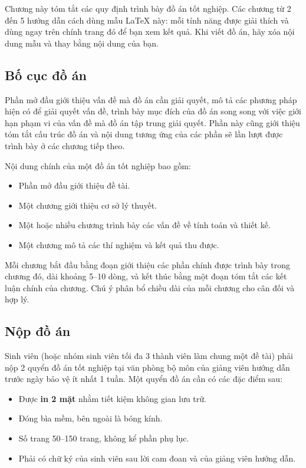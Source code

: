 Chương này tóm tắt các quy định trình bày đồ án tốt nghiệp. Các chương từ 2 đến 5 hướng dẫn cách dùng mẫu LaTeX này: mỗi tính năng được giải thích và dùng ngay trên chính trang đó để bạn xem kết quả. Khi viết đồ án, hãy xóa nội dung mẫu và thay bằng nội dung của bạn.

\subsection{Bố cục đồ án}
Phần mở đầu giới thiệu vấn đề mà đồ án cần giải quyết, mô tả các phương pháp hiện có để giải quyết vấn đề, trình bày mục đích của đồ án song song với việc giới hạn phạm vi của vấn đề mà đồ án tập trung giải quyết. Phần này cũng giới thiệu tóm tắt cấu trúc đồ án và nội dung tương ứng của các phần sẽ lần lượt được trình bày ở các chương tiếp theo.

Nội dung chính của một đồ án tốt nghiệp bao gồm:
\begin{itemize}
    \item Phần mở đầu giới thiệu đề tài.
    \item Một chương giới thiệu cơ sở lý thuyết.
    \item Một hoặc nhiều chương trình bày các vấn đề về tính toán và thiết kế.
    \item Một chương mô tả các thí nghiệm và kết quả thu được.
\end{itemize}

Mỗi chương bắt đầu bằng đoạn giới thiệu các phần chính được trình bày trong chương đó, dài khoảng 5--10 dòng, và kết thúc bằng một đoạn tóm tắt các kết luận chính của chương. Chú ý phân bổ chiều dài của mỗi chương cho cân đối và hợp lý.

\subsection{Nộp đồ án}
Sinh viên (hoặc nhóm sinh viên tối đa 3 thành viên làm chung một đề tài) phải nộp 2 quyển đồ án tốt nghiệp tại văn phòng bộ môn của giảng viên hướng dẫn trước ngày bảo vệ ít nhất 1 tuần. Một quyển đồ án cần có các đặc điểm sau:
\begin{itemize}
    \item Được \textbf{in 2 mặt} nhằm tiết kiệm không gian lưu trữ.
    \item Đóng bìa mềm, bên ngoài là bóng kính.
    \item Số trang 50--150 trang, không kể phần phụ lục.
    \item Phải có chữ ký của sinh viên sau lời cam đoan và của giảng viên hướng dẫn.
\end{itemize}

